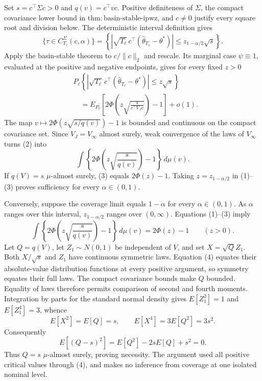 Set \(s=c^\top\Sigma c>0\) and \(q(v)=c^\top vc\).  Positive definiteness
of \(\Sigma\), the compact covariance lower bound in
\(\mathrm{thm:basin\text{-}stable\text{-}ipwz}\), and \(c\ne0\) justify
every square root and division below.  The deterministic interval definition
gives
\[
 \{\tau\in C_{T_\ell}^{\Sigma}(c,\alpha)\}
 =\left\{\left|\sqrt{T_\ell}\,c^\top
 (\widehat\theta_{T_\ell}-\theta^*)\right|
 \le z_{1-\alpha/2}\sqrt s\right\}.
\tag{1}
\]
Apply the basin-stable theorem to \(c/\|c\|_2\) and rescale.  Its marginal
case \(\psi\equiv1\), evaluated at the positive and negative endpoints, gives
for every fixed \(z>0\)
\[
 \begin{aligned}
 &P_\ell\!\left\{\left|\sqrt{T_\ell}\,c^\top
 (\widehat\theta_{T_\ell}-\theta^*)\right|\le z\sqrt s\right\}\\
 &\quad=E_{P_\ell}\!\left[
 2\Phi\!\left(z\sqrt{\frac{s}{c^\top V_Jc}}\right)-1\right]+o(1).
 \end{aligned}
\tag{2}
\]
The map
\(v\mapsto2\Phi(z\sqrt{s/q(v)})-1\) is bounded and continuous on the
compact covariance set.  Since \(V_J=V_\infty\) almost surely, weak
convergence of the laws of \(V_\infty\) turns (2) into
\[
 \int\left\{2\Phi\!\left(z\sqrt{\frac{s}{q(v)}}\right)-1\right\}
 \,d\mu(v).
\tag{3}
\]
If \(q(V)=s\) \(\mu\)-almost surely, (3) equals \(2\Phi(z)-1\).  Taking
\(z=z_{1-\alpha/2}\) in (1)--(3) proves sufficiency for every
\(\alpha\in(0,1)\).

Conversely, suppose the coverage limit equals \(1-\alpha\) for every
\(\alpha\in(0,1)\).  As \(\alpha\) ranges over this interval,
\(z_{1-\alpha/2}\) ranges over \((0,\infty)\).  Equations (1)--(3) imply
\[
 \int\left\{2\Phi\!\left(z\sqrt{\frac{s}{q(v)}}\right)-1\right\}
 \,d\mu(v)=2\Phi(z)-1
 \qquad(z>0).
\tag{4}
\]
Let \(Q=q(V)\), let \(Z_1\sim N(0,1)\) be independent of \(V\), and set
\(X=\sqrt QZ_1\).  Both \(X/\sqrt s\) and \(Z_1\) have continuous symmetric
laws.  Equation (4) equates their absolute-value distribution functions at
every positive argument, so symmetry equates their full laws.  The compact
covariance bounds make \(Q\) bounded.  Equality of laws therefore permits
comparison of second and fourth moments.  Integration by parts for the
standard normal density gives \(E[Z_1^2]=1\) and \(E[Z_1^4]=3\), whence
\[
 E[X^2]=E[Q]=s,
 \qquad E[X^4]=3E[Q^2]=3s^2.
\tag{5}
\]
Consequently
\[
 E[(Q-s)^2]=E[Q^2]-2sE[Q]+s^2=0.
\tag{6}
\]
Thus \(Q=s\) \(\mu\)-almost surely, proving necessity.  The argument used
all positive critical values through (4), and makes no inference from
coverage at one isolated nominal level.